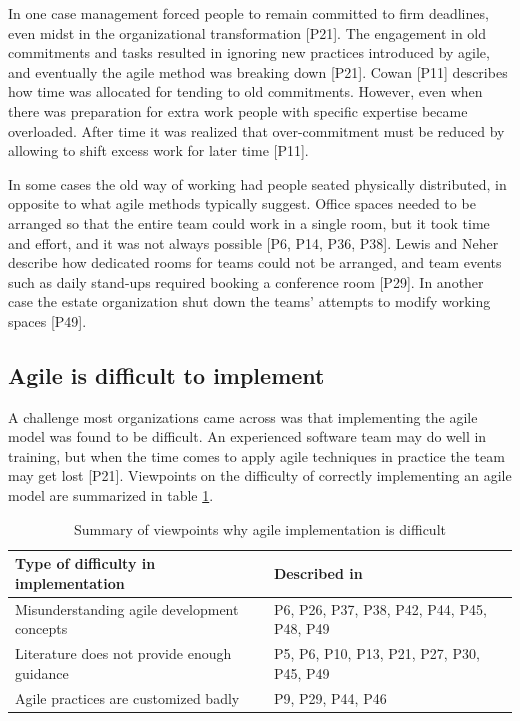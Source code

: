 In one case management forced people to remain committed to firm deadlines, even
midst in the organizational transformation [P21]. The engagement in old
commitments and tasks resulted in ignoring new practices introduced by agile,
and eventually the agile method was breaking down [P21].
Cowan [P11] describes how time was allocated for tending to old commitments.
However, even when there was preparation for extra work people with specific
expertise became overloaded. After time it was realized that over-commitment must
be reduced by allowing to shift excess work for later time [P11].



In some cases the old way of working had people seated physically distributed,
in opposite to what agile methods typically suggest. Office spaces needed to be
arranged so that the entire team could work in a single room, but it took time
and effort, and it was not always possible [P6, P14, P36, P38]. Lewis and Neher
describe how dedicated rooms for teams could not be arranged, and team events
such as daily stand-ups required booking a conference room [P29]. In another
case the estate organization shut down the teams' attempts to modify working
spaces [P49].


\subsection{Agile is difficult to implement}

A challenge most organizations came across was that implementing the agile model
was found to be difficult. An experienced software team may do well in training,
but when the time comes to apply agile techniques in practice the team may get
lost [P21]. Viewpoints on the difficulty of correctly implementing an agile
model are summarized in table \ref{table:challenges_difficulty}.


\begin{table}
    \centering
    \begin{tabular}{ >{\raggedright\arraybackslash}p{}
                     >{\raggedright\arraybackslash}p{} }
        \toprule
        Type of difficulty in implementation  &  Described in \\
        \midrule
        Misunderstanding agile development concepts  &
                P6, P26, P37, P38, P42, P44, P45, P48, P49      \\
        Literature does not provide enough guidance  &
                P5, P6, P10, P13, P21, P27, P30, P45, P49     \\
        Agile practices are customized badly   &
                P9, P29, P44, P46  \\
        \bottomrule
    \end{tabular}
    \caption{Summary of viewpoints why agile implementation is difficult}
    \label{table:challenges_difficulty}
\end{table}


